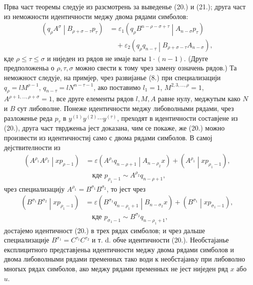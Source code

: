 ﻿\documentclass[11pt]{article}
\newcommand{\pair}[2]{\left(#1\middle|#2\right)}
\newcommand{\eps}{\varepsilon}
\begin{document}
Прва част теоремы следује из разсмотрень за выведенье (20.) и (21.); друга част из неможности идентичности меджу двома рядами симболов:
\[
\begin{aligned}
\pair{q_\rho A^\sigma}{B_{\rho+\sigma-\tau}p_\tau}
&=\eps_1\pair{q_\rho B^{n-\rho-\sigma+\tau}}{A_{n-\sigma}p_\tau}\\
&\quad+\eps_2\pair{q_\rho q_{n-\tau}}{B_{\rho+\sigma-\tau}A_{n-\sigma}},
\end{aligned}
\]
кде $\rho\le\tau\le\sigma$ и ниједен из рядов не имаје вагы $1\cdot(n-1)$. (Друге предположеньа о $\rho,\tau,\sigma$ можно свести к тому чрез замену означень рядов.) Та неможност следује, на примјер, чрез развијанье (8.) при специализацији $q_\rho=lM^{\rho-1}$, $q_{n-\tau}=lN^{n-\tau-1}$, ако поставимо $l_1=1$, $M^{2,3,\ldots,\rho}=1$, $A^{\rho+1,\ldots,\rho+\sigma}=1$, все друге елементы рядов $l,M,A$ равне нулу, меджутым како $N$ и $B$ сут либоволне. Понеже идентичности меджу либоволными рядами, чрез разложенье реда $p_\tau$ в $y^{(1)}y^{(2)}\cdots y^{(\tau)}$, преходят в идентичности составјене из (20.), друга част тврдженьа јест доказана, чим се покаже, же (20.) можно произвести из идентичностиј само с двома рядами симболов. В самој дејствителности из
\begin{equation}
\begin{aligned}
\pair{A^{\rho_1}A^{\rho_2}}{xp_{\rho-1}}
&=\eps\pair{A^{\rho_1}q_{n-\rho+1}}{A_{n-\rho_2}x}
+\pair{A^{\rho_1}}{xp_{\rho_1-1}},\\
&\quad \text{кде }p_{\rho_1-1}\sim A^{\rho_2}q_{n-\rho+1},
\end{aligned}
\tag{20a}
\end{equation}
чрез специализацију $A^{\rho_1}=B^{\sigma_1}B^{\sigma_2}$, то јест чрез
\[
\begin{aligned}
\pair{B^{\sigma_1}B^{\sigma_2}}{xp_{\rho_1-1}}
&=\eps\pair{B^{\sigma_1}q_{n-\rho_1+1}}{B_{n-\sigma_2}x}
+\pair{B^{\sigma_1}}{xp_{\sigma_1-1}},\\
&\quad \text{кде } p_{\sigma_1-1}\sim B^{\sigma_2}q_{n-\rho_1+1},
\end{aligned}
\]
достајемо идентичност (20.) в трех рядах симболов; и чрез дальше специализације $B^{\sigma_1}=C^{\tau_1}C^{\tau_2}$ и т. d. обче идентичности (20.). Необстајанье експлицитного представјеньа идентичности меджу двома рядами симболов и двома либоволными рядами пременных тако води к необстајаньу при либоволно многых рядах симболов, ако меджу рядами пременных не јест ниједен ряд $x$ або $u$.
\end{document}

